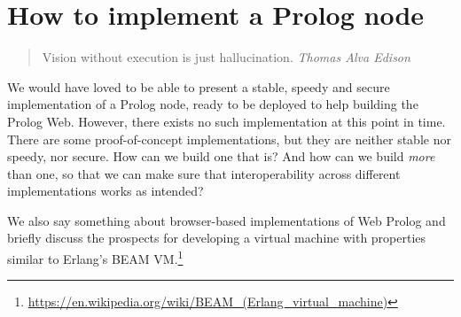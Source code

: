 \chapter{How to implement a Prolog node}\label{sec:profiles-and-implementation}

\begin{quotation}
\flushright Vision without execution is just hallucination.
\flushright \textit{Thomas Alva Edison}
\vspace{0.5cm}
\end{quotation}

\noindent We would have loved to be able to present a stable, speedy and secure implementation of a Prolog node, ready to be deployed to help building the Prolog Web. However, there exists no such implementation at this point in time. There are some proof-of-concept implementations, but they are neither stable nor speedy, nor secure. How can we build one that is? And how can we build \textit{more} than one, so that we can make sure that interoperability across different implementations works as intended?



We also say something about browser-based implementations of Web Prolog and briefly discuss the prospects for developing a virtual machine with properties similar to Erlang's BEAM VM.\footnote{\url{https://en.wikipedia.org/wiki/BEAM\_(Erlang\_virtual\_machine)}}



%




%
%



